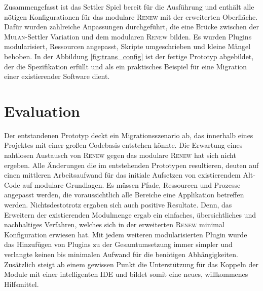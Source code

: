 	Zusammengefasst ist das Settler Spiel bereit für die Ausführung und enthält alle nötigen Konfigurationen für das modulare \textsc{Renew} mit der erweiterten Oberfläche. Dafür wurden zahlreiche Anpassungen durchgeführt, die eine Brücke zwischen der \textsc{Mulan}-Settler Variation und dem modularen \textsc{Renew} bilden. Es wurden Plugins modularisiert, Ressourcen angepasst, Skripte umgeschrieben und kleine Mängel behoben. \newline
	In der Abbildung \ref{fig:trans_config} ist der fertige Prototyp abgebildet, der die Spezifikation erfüllt und als ein praktisches Beispiel für eine Migration einer existierender Software dient. 

\section{Evaluation}
	Der entstandenen Prototyp deckt ein Migrationsszenario ab, das innerhalb eines Projektes mit einer großen Codebasis entstehen könnte. Die Erwartung eines nahtlosen Austausch von \textsc{Renew} gegen das modulare \textsc{Renew} hat sich nicht ergeben. Alle Änderungen die im entstehenden Prototypen resultieren, deuten auf einen mittleren Arbeitsaufwand für das initiale Aufsetzen von existierendem Alt-Code auf modulare Grundlagen. Es müssen Pfade, Ressourcen und Prozesse angepasst werden, die voraussichtlich alle Bereiche eine Applikation betreffen werden.\newline
	Nichtsdestotrotz ergaben sich auch positive Resultate. Denn, das Erweitern der existierenden Modulmenge ergab ein einfaches, übersichtliches und nachhaltiges Verfahren, welches sich in der erweiterten \textsc{Renew} minimal Konfiguration erwiesen hat. Mit jedem weiteren modularisierten Plugin wurde das Hinzufügen von Plugins zu der Gesamtumsetzung immer simpler und verlangte keinen bis minimalen Aufwand für die benötigen Abhängigkeiten. Zusätzlich steigt ab einem gewissen Punkt die Unterstützung für das Koppeln der Module mit einer intelligenten IDE und bildet somit eine neues, willkommenes Hilfsmittel.
